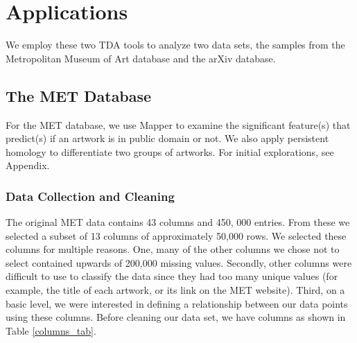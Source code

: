 \documentclass[12pt]{article}
\theoremstyle{definition}
\begin{document}
\section{Applications}
We employ these two TDA tools to analyze two data sets, the samples from the Metropolitan Museum of Art database and the arXiv database.
\subsection{The MET Database}
For the MET database, we use Mapper to examine the significant feature(s) that predict(s) if an artwork is in public domain or not. We also apply persistent homology to differentiate two groups of artworks. For initial explorations, see Appendix. 
\subsubsection{Data Collection and Cleaning}
The original MET data \cite{metdata} contains 43 columns and 450, 000 entries. From these we selected a subset of 13 columns of approximately 50,000 rows. We selected these columns for multiple reasons. One, many of the other columns we chose not to select contained upwards of 200,000 missing values. Secondly, other columns were difficult to use to classify the data since they had too many unique values (for example, the title of each artwork, or its link on the MET website). Third, on a basic level, we were interested in defining a relationship between our data points using these columns. Before cleaning our data set, we have columns as shown in Table \ref{columns_tab}.\\
\end{document}
